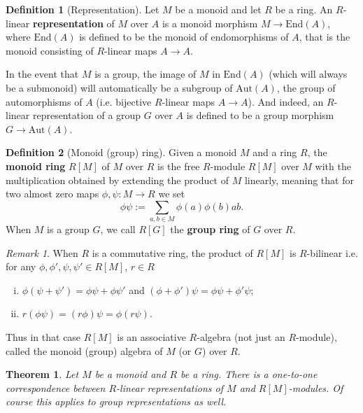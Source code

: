 \documentclass[a4paper,12pt,parskip=half*,chapterprefix=true,numbers=noendperiod]{scrreprt}
\newtheorem{theorem}{Theorem}[section]
\theoremstyle{definition}
\newtheorem{definition}{Definition}[section]
\theoremstyle{remark}
\newtheorem*{remark}{Remark}
\begin{document}
\begin{definition}[Representation]
	Let $M$ be a monoid and let $R$ be a ring. An $R$-linear \textbf{representation} of $M$ over $A$ is a monoid morphism $M\to\text{End}(A)$, where $\text{End}(A)$ is defined to be the monoid of endomorphisms of $A$, that is the monoid consisting of $R$-linear maps $A\to A$.
	
	In the event that $M$ is a group, the image of $M$ in $\text{End}(A)$ (which will always be a submonoid) will automatically be a subgroup of $\text{Aut}(A)$, the group of automorphisms of $A$ (i.e. bijective $R$-linear maps $A\to A$). And indeed, an $R$-linear representation of a group $G$ over $A$ is defined to be a group morphism $G\to\text{Aut}(A)$.
\end{definition}

\begin{definition}[Monoid (group) ring]
	Given a monoid $M$ and a ring $R$, the \textbf{monoid ring} $R[M]$ of $M$ over $R$ is the free $R$-module $R[M]$ over $M$ with the multiplication obtained by extending the product of $M$ linearly, meaning that for two almost zero maps $\phi,\psi:M\to R$ we set
	\begin{equation*}
		\phi\psi:=\sum_{a,b\in M}\phi(a)\phi(b)ab.
	\end{equation*}
	When $M$ is a group $G$, we call $R[G]$ the \textbf{group ring} of $G$ over $R$.
\end{definition}
\begin{remark}
	When $R$ is a commutative ring, the product of $R[M]$ is $R$-bilinear i.e. for any $\phi, \phi',\psi,\psi'\in R[M]$, $r\in R$
	\begin{enumerate}[(i)]
		\item $\phi(\psi+\psi')=\phi\psi+\phi\psi'$ and $(\phi+\phi')\psi=\phi\psi+\phi'\psi$;
		\item $r(\phi\psi)=(r\phi)\psi=\phi(r\psi)$.
	\end{enumerate}
	Thus in that case $R[M]$ is an associative $R$-algebra (not just an $R$-module), called the monoid (group) algebra of $M$ (or $G$) over $R$.
\end{remark}
\begin{theorem}\label{thm:MonoidRingRepresentation}
	Let $M$ be a monoid and $R$ be a ring. There is a one-to-one correspondence between $R$-linear representations of $M$ and $R[M]$-modules. Of course this applies to group representations as well.
\end{theorem}
\end{document}

